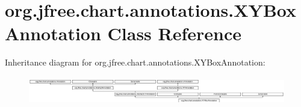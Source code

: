 \hypertarget{classorg_1_1jfree_1_1chart_1_1annotations_1_1_x_y_box_annotation}{}\section{org.\+jfree.\+chart.\+annotations.\+X\+Y\+Box\+Annotation Class Reference}
\label{classorg_1_1jfree_1_1chart_1_1annotations_1_1_x_y_box_annotation}
Inheritance diagram for org.\+jfree.\+chart.\+annotations.\+X\+Y\+Box\+Annotation\+:\begin{figure}[H]
\begin{center}
\leavevmode
\includegraphics[height=1.248607cm]{classorg_1_1jfree_1_1chart_1_1annotations_1_1_x_y_box_annotation}
\end{center}
\end{figure}
